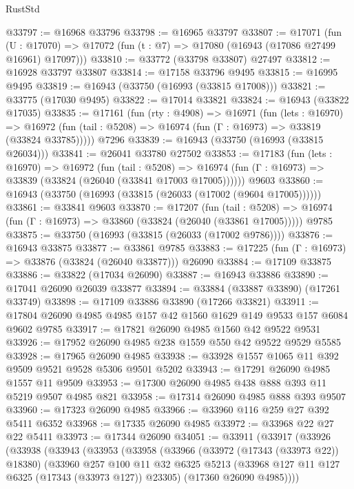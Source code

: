 \begin{lexlean}{RustStd}
\begin{coremodule}
@33797 := @16968 @33796
@33798 := @16965 @33797
@33807 := @17071
    (fun (U : @17070) => @17072 (fun (t : @7) => @17080 (@16943 (@17086 @27499 @16961) @17097)))
@33810 := @33772 (@33798 @33807) @27497
@33812 := @16928 @33797 @33807
@33814 := @17158 @33796 @9495
@33815 := @16995 @9495
@33819 := @16943 (@33750 (@16993 (@33815 @17008)))
@33821 := @33775 (@17030 @9495)
@33822 := @17014 @33821
@33824 := @16943 (@33822 @17035)
@33835 := @17161
    (fun (rty : @4908) =>
    @16971
      (fun (lets : @16970) =>
      @16972 (fun (tail : @5208) => @16974 (fun (Γ : @16973) => @33819 (@33824 @33785)))))
    @7296
@33839 := @16943 (@33750 (@16993 (@33815 @26034)))
@33841 := @26041 @33780 @27502
@33853 := @17183
    (fun (lets : @16970) =>
    @16972
      (fun (tail : @5208) =>
      @16974 (fun (Γ : @16973) => @33839 (@33824 (@26040 (@33841 @17003 @17005))))))
    @9603
@33860 := @16943 (@33750 (@16993 (@33815 (@26033 (@17002 (@9604 @17005))))))
@33861 := @33841 @9603
@33870 := @17207
    (fun (tail : @5208) => @16974 (fun (Γ : @16973) => @33860 (@33824 (@26040 (@33861 @17005)))))
    @9785
@33875 := @33750 (@16993 (@33815 (@26033 (@17002 @9786))))
@33876 := @16943 @33875
@33877 := @33861 @9785
@33883 := @17225 (fun (Γ : @16973) => @33876 (@33824 (@26040 @33877))) @26090
@33884 := @17109 @33875
@33886 := @33822 (@17034 @26090)
@33887 := @16943 @33886
@33890 := @17041 @26090 @26039 @33877
@33894 := @33884 (@33887 @33890) (@17261 @33749)
@33898 := @17109 @33886 @33890 (@17266 @33821)
@33911 := @17804 @26090 @4985 @4985 @157 @42 @1560 @1629 @149 @9533 @157 @6084 @9602 @9785
@33917 := @17821 @26090 @4985 @1560 @42 @9522 @9531
@33926 := @17952 @26090 @4985 @238 @1559 @550 @42 @9522 @9529 @5585
@33928 := @17965 @26090 @4985
@33938 := @33928 @1557 @1065 @11 @392 @9509 @9521 @9528 @5306 @9501 @5202
@33943 := @17291 @26090 @4985 @1557 @11 @9509
@33953 := @17300 @26090 @4985 @438 @888 @393 @11 @5219 @9507 @4985 @821
@33958 := @17314 @26090 @4985 @888 @393 @9507
@33960 := @17323 @26090 @4985
@33966 := @33960 @116 @259 @27 @392 @5411 @6352
@33968 := @17335 @26090 @4985
@33972 := @33968 @22 @27 @22 @5411
@33973 := @17344 @26090
@34051 := @33911
    (@33917
      (@33926
        (@33938
          (@33943
            (@33953
              (@33958
                (@33966
                  (@33972 (@17343 (@33973 @22)) @18380)
                  (@33960
                    @257
                    @100
                    @11
                    @32
                    @6325
                    @5213
                    (@33968 @127 @11 @127 @6325 (@17343 (@33973 @127)) @23305)
                    (@17360 @26090 @4985))))

\end{coremodule}
\end{lexlean}
